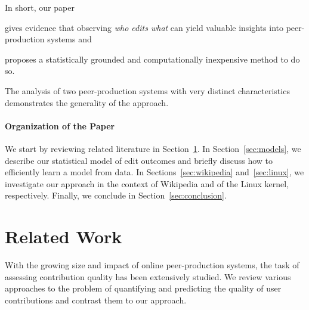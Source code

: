 \documentclass[format=sigconf]{acmart}
\begin{document}
In short, our paper
\begin{enuminline}
\item gives evidence that observing \emph{who edits what} can yield valuable insights into peer-production systems and
\item proposes a statistically grounded and computationally inexpensive method to do so.
\end{enuminline}
The analysis of two peer-production systems with very distinct characteristics demonstrates the generality of the approach.

\paragraph{Organization of the Paper}
We start by reviewing related literature in Section~\ref{sec:relwork}.
In Section~\ref{sec:models}, we describe our statistical model of edit outcomes and briefly discuss how to efficiently learn a model from data.
In Sections~\ref{sec:wikipedia} and~\ref{sec:linux}, we investigate our approach in the context of Wikipedia and of the Linux kernel, respectively.
Finally, we conclude in Section~\ref{sec:conclusion}.
\section{Related Work}
\label{sec:relwork}

With the growing size and impact of online peer-production systems, the task of assessing contribution quality has been extensively studied.
We review various approaches to the problem of quantifying and predicting the quality of user contributions and contrast them to our approach.
\end{document}
